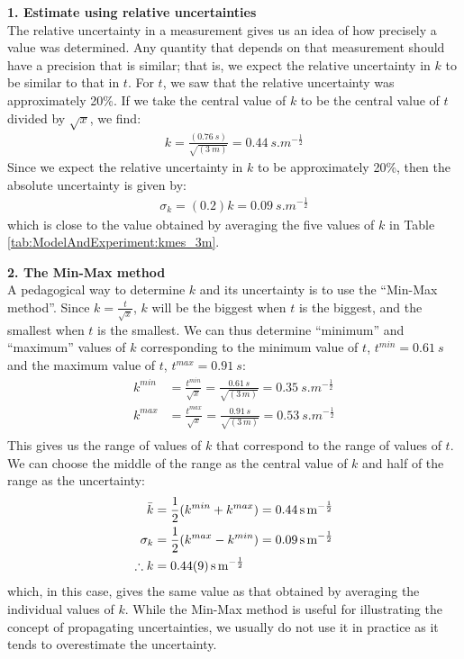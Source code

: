\textbf{1. Estimate using relative uncertainties}\\
The relative uncertainty in a measurement gives us an idea of how precisely a value was determined. Any quantity that depends on that measurement should have a precision that is similar; that is, we expect the relative uncertainty in $k$ to be similar to that in $t$. For $t$, we saw that the relative uncertainty was approximately 20\%. If we take the central value of $k$ to be the central value of $t$ divided by $\sqrt x$, we find:
\begin{align*}
k=\frac{(\SI{0.76}{s})}{\sqrt{(\SI{3}{m})}}=\SI{0.44}{s.m^{-\frac{1}{2}}}
\end{align*} 
Since we expect the relative uncertainty in $k$ to be approximately 20\%, then the absolute uncertainty is given by:
\begin{align*}
\sigma_k = (0.2) k=\SI{0.09}{s.m^{-\frac{1}{2}}}
\end{align*}
which is close to the value obtained by averaging the five values of $k$ in Table \ref{tab:ModelAndExperiment:kmes_3m}.

\textbf{2. The Min-Max method}\\
A pedagogical way to determine $k$ and its uncertainty is to use the ``Min-Max method''. Since $k=\frac{t}{\sqrt x}$, $k$ will be the biggest when $t$ is the biggest, and the smallest when $t$ is the smallest. We can thus determine ``minimum'' and ``maximum'' values of $k$ corresponding to the minimum value of $t$, $t^{min}=\SI{0.61}{s}$ and the maximum value of $t$, $t^{max}=\SI{0.91}{s}$:
\begin{align*}
k^{min} &= \frac{t^{min}}{\sqrt x}=\frac{0.61\,s}{\sqrt{(3\,m)}} = \SI{0.35}{s.m^{-\frac{1}{2}}}\\
k^{max} &= \frac{t^{max}}{\sqrt x}=\frac{0.91\,s}{\sqrt{(3\,m)}} = \SI{0.53}{s.m^{-\frac{1}{2}}}\\
\end{align*}
This gives us the range of values of $k$ that correspond to the range of values of $t$. We can choose the middle of the range as the central value of $k$ and half of the range as the uncertainty:
\begin{align*}
\bar k &= \frac{1}{2}(k^{min}+k^{max})= \SI{0.44}{s.m^{-\frac{1}{2}}}\\
\sigma_k &= \frac{1}{2}(k^{max}-k^{min})= \SI{0.09}{s.m^{-\frac{1}{2}}}\\
\therefore k&= \SI{0.44 \pm 0.09}{s.m^{-\frac{1}{2}}}
\end{align*}
which, in this case, gives the same value as that obtained by averaging the individual values of $k$. While the Min-Max method is useful for illustrating the concept of propagating uncertainties, we usually do not use it in practice as it tends to overestimate the uncertainty. 

